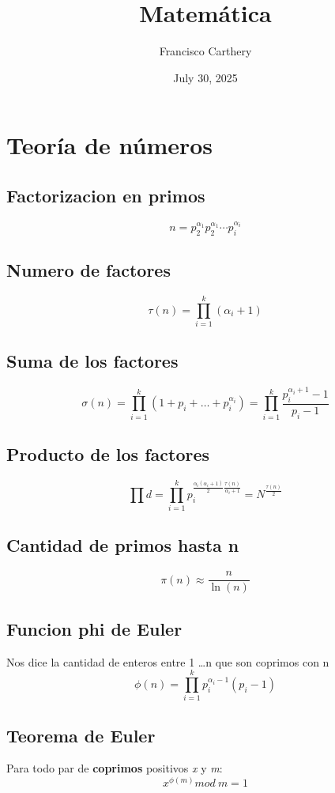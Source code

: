 \documentclass{article}
\title{Matemática}
\author{Francisco Carthery}
\date{July 30, 2025}
\begin{document}
\maketitle

\section{Teoría de números}

\subsection{Factorizacion en primos}
\[
n = p_2^{\alpha_1} p_2^{\alpha_1} \cdots p_i^{\alpha_i}
\]


\subsection{Numero de factores}
\[
\tau(n) = \prod_{i=1}^{k} (\alpha_i + 1)
\]

\subsection{Suma de los factores}
\[
\sigma(n) = \prod_{i=1}^{k} (1 + p_i + \dots + p_i^{\alpha_i}) = \prod_{i=1}^{k} \frac{p_i^{\alpha_i + 1} - 1}{p_i - 1}
\]

\subsection{Producto de los factores}
\[
\prod d = \prod_{i = 1}^{k} p_i^{\frac{\alpha_i (\alpha_i + 1)}{2} \frac{\tau (n)}{\alpha_i + 1}} = N^{\frac{\tau(n)}{2}}
\]

\subsection{Cantidad de primos hasta n}
\[
\pi(n) \approx \frac{n}{\ln(n)}
\]

\subsection{Funcion phi de Euler}
Nos dice la cantidad de enteros entre 1 \dots n que son coprimos con n
\[
\phi(n) = \prod_{i=1}^{k} p_i^{\alpha_i - 1} (p_i - 1)
\]

\subsection{Teorema de Euler}
Para todo par de \textbf{coprimos} positivos \textit{x} y \textit{m}:
\[
x^{\phi(m)} mod \: \textit{m} = 1
\]
\end{document}
